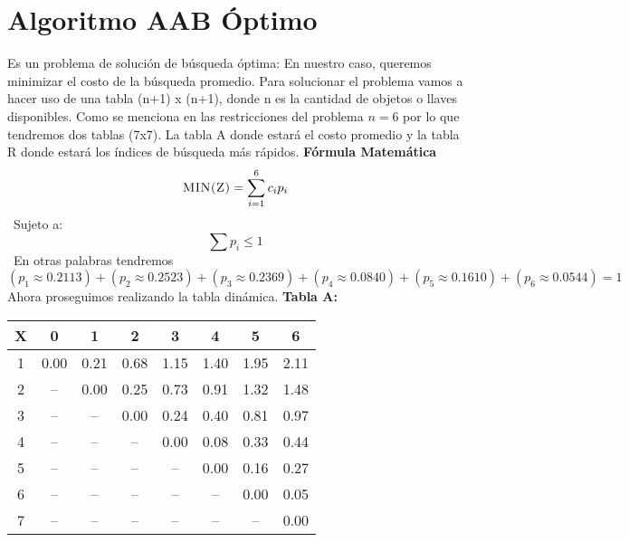 \documentclass[10pt,letterpaper]{article}
\begin{document}
\section{Algoritmo AAB Óptimo} 
        Es un problema de solución de búsqueda óptima:  
        En nuestro caso, queremos minimizar el costo de la búsqueda promedio. 
        Para solucionar el problema vamos a hacer uso de una tabla (n+1) x (n+1), donde n es la cantidad 
        de objetos o llaves disponibles. 
        Como se menciona en las restricciones del problema $n = 6$ por lo que tendremos 
        dos tablas (7x7). La tabla A donde estará el costo promedio y la tabla R donde estará 
        los índices de búsqueda más rápidos. \newline \newline \newline 
        \textbf{\Large Fórmula Matemática} 
        \[ \textsc{\normalsize MIN(Z)}\\[0.5cm] = \sum_{i=1}^{6}c_{i}p_{i} \] 
        \ Sujeto a:  
        \[ \sum p_{i} \leq 1 \] 
        \ En otras palabras tendremos 
\[ (p_{1} \approx 0.2113)+(p_{2} \approx 0.2523)+(p_{3} \approx 0.2369)+(p_{4} \approx 0.0840)+(p_{5} \approx 0.1610)+(p_{6} \approx 0.0544) = 1 \]
\newline Ahora proseguimos realizando la tabla dinámica.
\newline \newline \newline \textbf{Tabla A: }
\begin{center}
\begin{tabu} to 1.0\textwidth { | c | c | c | c | c | c | c | c | }
\hline
{}\color{black}\textbf{X} & \color{black}\textbf{0} & \color{black}\textbf{1} & \color{black}\textbf{2} & \color{black}\textbf{3} & \color{black}\textbf{4} & \color{black}\textbf{5} & \color{black}\textbf{6} \\ 
\hline
{}\color{black}1 & 0.00 & 0.21 & 0.68 & 1.15 & 1.40 & 1.95 & 2.11 \\ 
\hline
{}\color{black}2 &  --  & 0.00 & 0.25 & 0.73 & 0.91 & 1.32 & 1.48 \\ 
\hline
{}\color{black}3 &  --  &  --  & 0.00 & 0.24 & 0.40 & 0.81 & 0.97 \\ 
\hline
{}\color{black}4 &  --  &  --  &  --  & 0.00 & 0.08 & 0.33 & 0.44 \\ 
\hline
{}\color{black}5 &  --  &  --  &  --  &  --  & 0.00 & 0.16 & 0.27 \\ 
\hline
{}\color{black}6 &  --  &  --  &  --  &  --  &  --  & 0.00 & 0.05 \\ 
\hline
{}\color{black}7 &  --  &  --  &  --  &  --  &  --  &  --  & 0.00 \\ 
\hline
\end{tabu} \\
\end{center}
\end{document}
